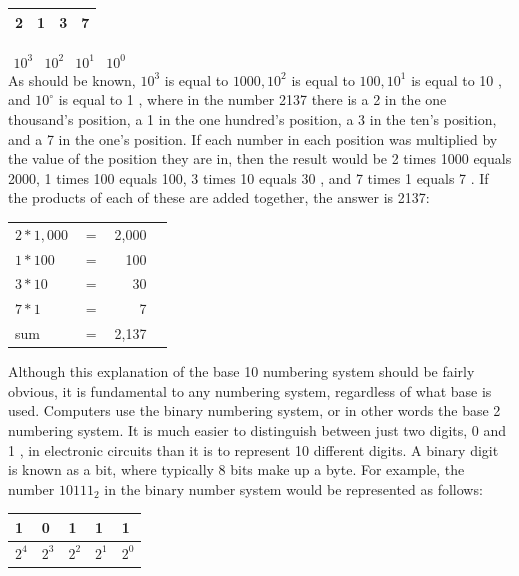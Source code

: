 \documentclass[10pt]{book}
\begin{document}
\begin{center}
\begin{tabular}{|l|l|l|l|}
\hline
2 & 1 & 3 & 7 \\
\hline
\end{tabular}
\end{center}

$\begin{array}{llll}10^{3} & 10^{2} & 10^{1} & 10^{0}\end{array}$\\
As should be known, $10^{3}$ is equal to $1000,10^{2}$ is equal to $100,10^{1}$ is equal to 10 , and $10^{\circ}$ is equal to 1 , where in the number 2137 there is a 2 in the one thousand's position, a 1 in the one hundred's position, a 3 in the ten's position, and a 7 in the one's position. If each number in each position was multiplied by the value of the position they are in, then the result would be 2 times 1000 equals 2000, 1 times 100 equals 100, 3 times 10 equals 30 , and 7 times 1 equals 7 . If the products of each of these are added together, the answer is 2137:

\begin{center}
\begin{tabular}{llrr}
$2 * 1,000$ & $=$ & 2,000 \\
$1 * 100$ & $=$ & 100 \\
$3 * 10$ & $=$ & 30 \\
$7 * 1$ & $=$ & 7 \\
\hline
sum & $=$ & 2,137 \\
\hline
\end{tabular}
\end{center}

Although this explanation of the base 10 numbering system should be fairly obvious, it is fundamental to any numbering system, regardless of what base is used. Computers use the binary numbering system, or in other words the base 2 numbering system. It is much easier to distinguish between just two digits, 0 and 1 , in electronic circuits than it is to represent 10 different digits. A binary digit is known as a bit, where typically 8 bits make up a byte. For example, the number $10111_{2}$ in the binary number system would be represented as follows:

\begin{center}
\begin{tabular}{|l|l|l|l|l|}
\hline
1 & 0 & 1 & 1 & 1 \\
\hline
$2^{4}$ & $2^{3}$ & $2^{2}$ & $2^{1}$ & $2^{0}$ \\
\hline
\end{tabular}
\end{center}
\end{document}

